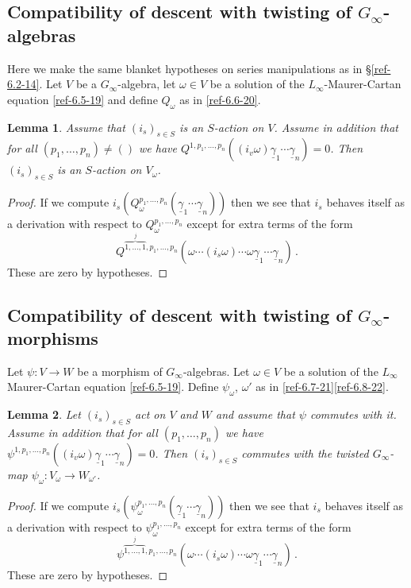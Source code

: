 \documentclass{amsart}
\numberwithin{equation}{section}
\newtheorem{lemmas}{Lemma}[subsection]
\theoremstyle{definition}
\theoremstyle{remark}
\begin{document}
\subsection{Compatibility of descent with twisting of $G_\infty$-algebras}
\label{ref-7.3-28}

Here we make the same blanket hypotheses on series manipulations as in
\S\ref{ref-6.2-14}. Let $V$ be a $G_\infty$-algebra,
let $\omega\in V$ be a solution of the $L_\infty$-Maurer-Cartan equation
\eqref{ref-6.5-19} and define $Q_\omega$ as in \eqref{ref-6.6-20}. 
\begin{lemmas}
  Assume that $(i_s)_{s\in S}$ is an $S$-action on $V$.
  Assume in addition that for all $(p_1,\ldots,p_n)\neq ()$ we have
  $Q^{1,p_1,\ldots,p_n} ((i_v\omega) \underline{\gamma}_1\cdots \underline{\gamma}_n)=0$. 
  Then $(i_s)_{s\in S}$ is an $S$-action on $V_\omega$.
\end{lemmas}
\begin{proof}
  If we compute $i_s(Q^{p_1,\dots,p_n}_\omega(\underline{\gamma}_1\cdots \underline{\gamma}_n))$ then
  we see that $i_s$ behaves itself as a derivation with respect to
  $Q^{p_1,\dots,p_n}_\omega$ except for extra terms of the form
  $$
Q^{\overbrace{1,\dots,1}^j,{p_1,\dots,p_n}} (\omega\cdots (i_s\omega)\cdots \omega
\underline{\gamma}_1\cdots \underline{\gamma}_n)\,.
  $$
  These are zero by
  hypotheses.
\end{proof}

\subsection{Compatibility of descent with twisting of $G_\infty$-morphisms}

Let $\psi:V\rightarrow W$ be a morphism of $G_\infty$-algebras.  Let $\omega\in V$
be a solution of the $L_\infty$ Maurer-Cartan equation \eqref{ref-6.5-19}.
Define $\psi_\omega$, $\omega'$ as in \eqref{ref-6.7-21}\eqref{ref-6.8-22}. 
\begin{lemmas}  
\label{ref-7.4.1-29}
Let $(i_s)_{s\in S}$
act on $V$ and $W$ and assume that $\psi$  commutes with it.
Assume  in addition that for all $(p_1,\ldots,p_n)$ we have
$\psi^{1,p_1,\ldots,p_n} ((i_v\omega) \underline{\gamma}_1\cdots\underline{\gamma}_n)=0$. 
Then $(i_s)_{s\in S}$ commutes with the twisted $G_\infty$-map
$\psi_\omega:V_\omega\rightarrow W_{\omega'}$. 
\end{lemmas}
\begin{proof}
  If we compute $i_s(\psi^{p_1,\dots,p_n}_\omega(\underline{\gamma}_1\cdots \underline{\gamma}_n))$
  then we see that $i_s$ behaves itself as a derivation
  with respect to $\psi^{p_1,\dots,p_n}_\omega$ except for extra terms
  of the form 
$$
\psi^{\overbrace{1,\ldots,1}^j,{p_1,\dots,p_n} }(\omega\cdots (i_s\omega)\cdots\omega
\underline{\gamma}_1\cdots\underline{\gamma}_n)\,.
$$
  These are zero by hypotheses.
\end{proof}
\end{document}
